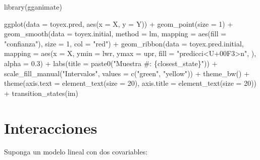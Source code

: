 \documentclass[
  12pt,
]{book}
\newenvironment{Shaded}{\begin{snugshade}}{\end{snugshade}}
\newcommand{\AttributeTok}[1]{\textcolor[rgb]{0.77,0.63,0.00}{#1}}
\newcommand{\DecValTok}[1]{\textcolor[rgb]{0.00,0.00,0.81}{#1}}
\newcommand{\FloatTok}[1]{\textcolor[rgb]{0.00,0.00,0.81}{#1}}
\newcommand{\FunctionTok}[1]{\textcolor[rgb]{0.00,0.00,0.00}{#1}}
\newcommand{\NormalTok}[1]{#1}
\newcommand{\SpecialCharTok}[1]{\textcolor[rgb]{0.00,0.00,0.00}{#1}}
\newcommand{\StringTok}[1]{\textcolor[rgb]{0.31,0.60,0.02}{#1}}
\begin{document}
\begin{Shaded}
\begin{Highlighting}[]
\FunctionTok{library}\NormalTok{(gganimate)}

\FunctionTok{ggplot}\NormalTok{(}\AttributeTok{data =}\NormalTok{ toyex.pred, }\FunctionTok{aes}\NormalTok{(}\AttributeTok{x =}\NormalTok{ X, }\AttributeTok{y =}\NormalTok{ Y)) }\SpecialCharTok{+} \FunctionTok{geom\_point}\NormalTok{(}\AttributeTok{size =} \DecValTok{1}\NormalTok{) }\SpecialCharTok{+}
    \FunctionTok{geom\_smooth}\NormalTok{(}\AttributeTok{data =}\NormalTok{ toyex.initial, }\AttributeTok{method =}\NormalTok{ lm,}
        \AttributeTok{mapping =} \FunctionTok{aes}\NormalTok{(}\AttributeTok{fill =} \StringTok{"confianza"}\NormalTok{), }\AttributeTok{size =} \DecValTok{1}\NormalTok{,}
        \AttributeTok{col =} \StringTok{"red"}\NormalTok{) }\SpecialCharTok{+} \FunctionTok{geom\_ribbon}\NormalTok{(}\AttributeTok{data =}\NormalTok{ toyex.pred.initial,}
    \AttributeTok{mapping =} \FunctionTok{aes}\NormalTok{(}\AttributeTok{x =}\NormalTok{ X, }\AttributeTok{ymin =}\NormalTok{ lwr, }\AttributeTok{ymax =}\NormalTok{ upr, }\AttributeTok{fill =} \StringTok{"predicci\textless{}U+00F3\textgreater{}n"}\NormalTok{,}
\NormalTok{        ), }\AttributeTok{alpha =} \FloatTok{0.3}\NormalTok{) }\SpecialCharTok{+} \FunctionTok{labs}\NormalTok{(}\AttributeTok{title =} \FunctionTok{paste0}\NormalTok{(}\StringTok{"Muestra \#: \{closest\_state\}"}\NormalTok{)) }\SpecialCharTok{+}
    \FunctionTok{scale\_fill\_manual}\NormalTok{(}\StringTok{"Intervalos"}\NormalTok{, }\AttributeTok{values =} \FunctionTok{c}\NormalTok{(}\StringTok{"green"}\NormalTok{,}
        \StringTok{"yellow"}\NormalTok{)) }\SpecialCharTok{+} \FunctionTok{theme\_bw}\NormalTok{() }\SpecialCharTok{+} \FunctionTok{theme}\NormalTok{(}\AttributeTok{axis.text =} \FunctionTok{element\_text}\NormalTok{(}\AttributeTok{size =} \DecValTok{20}\NormalTok{),}
    \AttributeTok{axis.title =} \FunctionTok{element\_text}\NormalTok{(}\AttributeTok{size =} \DecValTok{20}\NormalTok{)) }\SpecialCharTok{+} \FunctionTok{transition\_states}\NormalTok{(im)}
\end{Highlighting}
\end{Shaded}

\hypertarget{interacciones}{%
\section{Interacciones}\label{interacciones}}

Suponga un modelo lineal con dos covariables:
\end{document}
